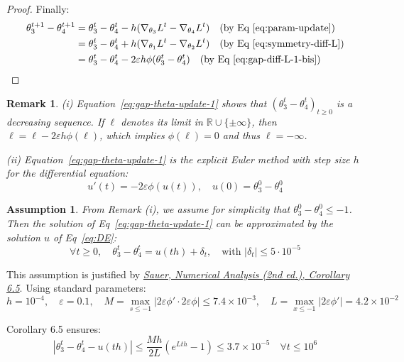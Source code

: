 \documentclass[11pt]{article}
\newtheorem{remark}{Remark}
\newtheorem{assumption}{Assumption}
\begin{document}
\begin{proof}
Finally:
\begin{align*}
\theta_3^{t+1} - \theta_4^{t+1} 
&= \theta_3^t - \theta_4^t - h(\nabla_{\theta_3} L^t - \nabla_{\theta_4} L^t) \quad \text{(by Eq~\eqref{eq:param-update})} \\
&= \theta_3^t - \theta_4^t + h(\nabla_{\theta_1} L^t - \nabla_{\theta_2} L^t) \quad \text{(by Eq~\eqref{eq:symmetry-diff-L})} \\
&= \theta_3^t - \theta_4^t - 2\varepsilon h \phi(\theta_3^t - \theta_4^t) \quad \text{(by Eq~\eqref{eq:gap-diff-L-1-bis})}
\end{align*}
\end{proof}

\begin{remark}
\textup{(i)} Equation~\eqref{eq:gap-theta-update-1} shows that $(\theta_3^t - \theta_4^t)_{t \geq 0}$ is a decreasing sequence. If $\ell$ denotes its limit in $\mathbb{R} \cup \{\pm\infty\}$, then $\ell = \ell - 2\varepsilon h \phi(\ell)$, which implies $\phi(\ell) = 0$ and thus $\ell = -\infty$.

\textup{(ii)} Equation~\eqref{eq:gap-theta-update-1} is the explicit Euler method with step size $h$ for the differential equation:
\begin{equation}
\label{eq:DE}
u'(t) = -2\varepsilon\phi(u(t)), \quad u(0) = \theta_3^0 - \theta_4^0
\end{equation}
\end{remark}

\begin{assumption}
\label{ass:main}
From Remark (i), we assume for simplicity that $\theta_3^0 - \theta_4^0 \leq -1$. Then the solution of Eq~\eqref{eq:gap-theta-update-1} can be approximated by the solution $u$ of Eq~\eqref{eq:DE}:
$$\boxed{\forall t \geq 0, \quad \theta_3^t - \theta_4^t = u(th) + \delta_t}, \quad \text{with } |\delta_t| \leq 5\cdot10^{-5}$$
\end{assumption}

This assumption is justified by \href{https://eclass.aueb.gr/modules/document/file.php/MISC249/Sauer%20-%20Numerical%20Analysis%202e.pdf}{\textit{Sauer, Numerical Analysis (2nd ed.), Corollary 6.5}}. Using standard parameters:
$$h = 10^{-4}, \quad \varepsilon = 0.1, \quad M = \max_{s \leq -1} |2\varepsilon\phi' \cdot 2\varepsilon\phi| \leq 7.4 \times 10^{-3}, \quad L = \max_{x \leq -1} |2\varepsilon\phi'| = 4.2 \times 10^{-2}$$

Corollary 6.5 ensures:
$$|\theta_3^t - \theta_4^t - u(th)| \leq \frac{Mh}{2L}(e^{Lth} - 1) \leq 3.7 \times 10^{-5} \quad \forall t \leq 10^6$$
\end{document}
